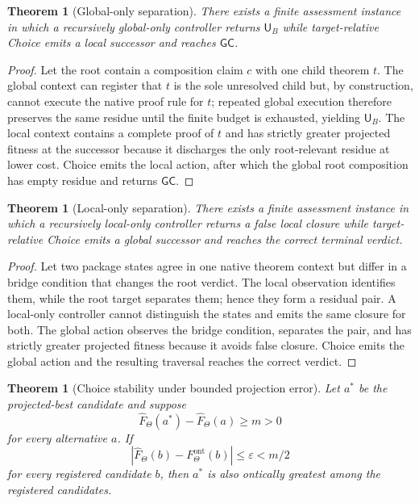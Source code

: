 \documentclass[10pt]{article}
\newtheorem{theorem}[definition]{Theorem}
\newcommand{\GC}{\mathsf{GC}}
\newcommand{\UB}{\mathsf{U}_B}
\newcommand{\ProjFit}{\widehat F}
\newcommand{\OntFit}{F^{\mathrm{ont}}}
\newcommand{\Target}{\Theta}
\begin{document}
\begin{theorem}[Global-only separation]\label{thm:global-only-separation}
There exists a finite assessment instance in which a recursively global-only controller returns $\UB$ while target-relative Choice emits a local successor and reaches $\GC$.
\end{theorem}

\begin{proof}
Let the root contain a composition claim $c$ with one child theorem $t$.  The global context can register that $t$ is the sole unresolved child but, by construction, cannot execute the native proof rule for $t$; repeated global execution therefore preserves the same residue until the finite budget is exhausted, yielding $\UB$.  The local context contains a complete proof of $t$ and has strictly greater projected fitness at the successor because it discharges the only root-relevant residue at lower cost.  Choice emits the local action, after which the global root composition has empty residue and returns $\GC$.
\end{proof}

\begin{theorem}[Local-only separation]\label{thm:local-only-separation}
There exists a finite assessment instance in which a recursively local-only controller returns a false local closure while target-relative Choice emits a global successor and reaches the correct terminal verdict.
\end{theorem}

\begin{proof}
Let two package states agree in one native theorem context but differ in a bridge condition that changes the root verdict.  The local observation identifies them, while the root target separates them; hence they form a residual pair.  A local-only controller cannot distinguish the states and emits the same closure for both.  The global action observes the bridge condition, separates the pair, and has strictly greater projected fitness because it avoids false closure.  Choice emits the global action and the resulting traversal reaches the correct verdict.
\end{proof}

\begin{theorem}[Choice stability under bounded projection error]\label{thm:margin}
Let $a^*$ be the projected-best candidate and suppose
\[
  \ProjFit_\Target(a^*)-\ProjFit_\Target(a)\ge m>0
\]
for every alternative $a$.  If
\[
  |\ProjFit_\Target(b)-\OntFit_\Target(b)|\le\varepsilon<m/2
\]
for every registered candidate $b$, then $a^*$ is also ontically greatest among the registered candidates.
\end{theorem}
\end{document}
